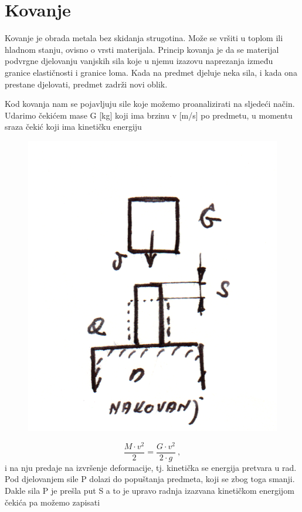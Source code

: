 \documentclass[a4paper,12pt]{article}
\numberwithin{figure}{section}
\begin{document}
\section{Kovanje}
Kovanje je obrada metala bez skidanja strugotina. Može se vršiti u toplom ili hladnom stanju, ovisno o vrsti materijala. Princip kovanja je da se materijal podvrgne djelovanju vanjskih sila koje u njemu izazovu naprezanja između granice elastičnosti i granice loma. Kada na predmet djeluje neka sila, i kada ona prestane djelovati, predmet zadrži novi oblik.\par
Kod kovanja nam se pojavljuju sile koje možemo proanalizirati na sljedeći način. Udarimo čekićem mase G [kg] koji ima brzinu v [m/s] po predmetu, u momentu sraza čekić koji ima kinetičku energiju
\begin{figure}[!h]
\centering
\includegraphics[scale=0.15]{image_40-1.png}
\end{figure}
\FloatBarrier
\begin{equation}
\frac{M\cdot v^{2}}{2} = \frac{G\cdot v^{2}}{2 \cdot g}\:,
\end{equation}
i na nju predaje na izvršenje deformacije, tj. kinetička se energija pretvara u rad. Pod  djelovanjem sile P dolazi do popuštanja predmeta, koji se zbog toga smanji. Dakle sila P je prešla put S a to je upravo radnja izazvana kinetičkom energijom čekića pa možemo zapisati
\end{document}
